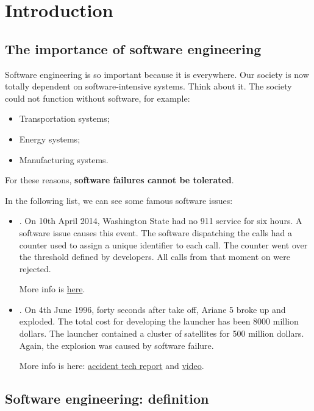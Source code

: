 \section{Introduction}

\subsection{The importance of software engineering}

Software engineering is so important because it is everywhere. Our society is now totally dependent on software-intensive systems. Think about it. The society could not function without software, for example:
\begin{itemize}
    \item Transportation systems;
    \item Energy systems;
    \item Manufacturing systems.
\end{itemize}
For these reasons, \textbf{software failures cannot be tolerated}.

\highspace
In the following list, we can see some famous software issues:
\begin{itemize}
    \item {}. On 10th April 2014, Washington State had no 911 service for six hours. A software issue causes this event. The software dispatching the calls had a counter used to assign a unique identifier to each call. The counter went over the threshold defined by developers. All calls from that moment on were rejected.
    
    More info is \href{https://www.theatlantic.com/technology/archive/2017/09/saving-the-world-from-code/540393/}{here}.

    \item {}. On 4th June 1996, forty seconds after take off, Ariane 5 broke up and exploded. The total cost for developing the launcher has been 8000 million dollars. The launcher contained a cluster of satellites for 500 million dollars. Again, the explosion was caused by software failure. 
    
    More info is here: \href{http://sunnyday.mit.edu/accidents/Ariane5accidentreport.html}{accident tech report} and \href{https://www.youtube.com/watch?v=PK_yguLapgA}{video}.
\end{itemize}

\newpage

\subsection{Software engineering: definition}

